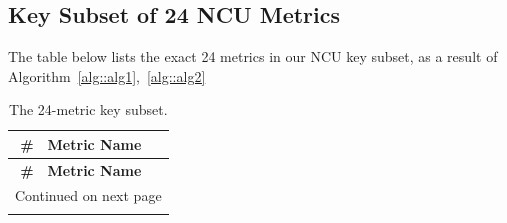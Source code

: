 \subsection{Key Subset of 24 NCU Metrics}\label{app:key24}

The table below lists the exact 24 metrics in our NCU key subset, as a result of Algorithm~\ref{alg::alg1},~\ref{alg::alg2}

\scriptsize
\begin{longtable}{rl}
\caption{The 24-metric key subset.}
\label{tab:key24}\\
\toprule
\textbf{\#} & \textbf{Metric Name} \\
\midrule
\endfirsthead
\toprule
\textbf{\#} & \textbf{Metric Name} \\
\midrule
\endhead
\midrule
\multicolumn{2}{r}{\small Continued on next page}\\
\endfoot
\bottomrule
\endlastfoot


\end{longtable}
